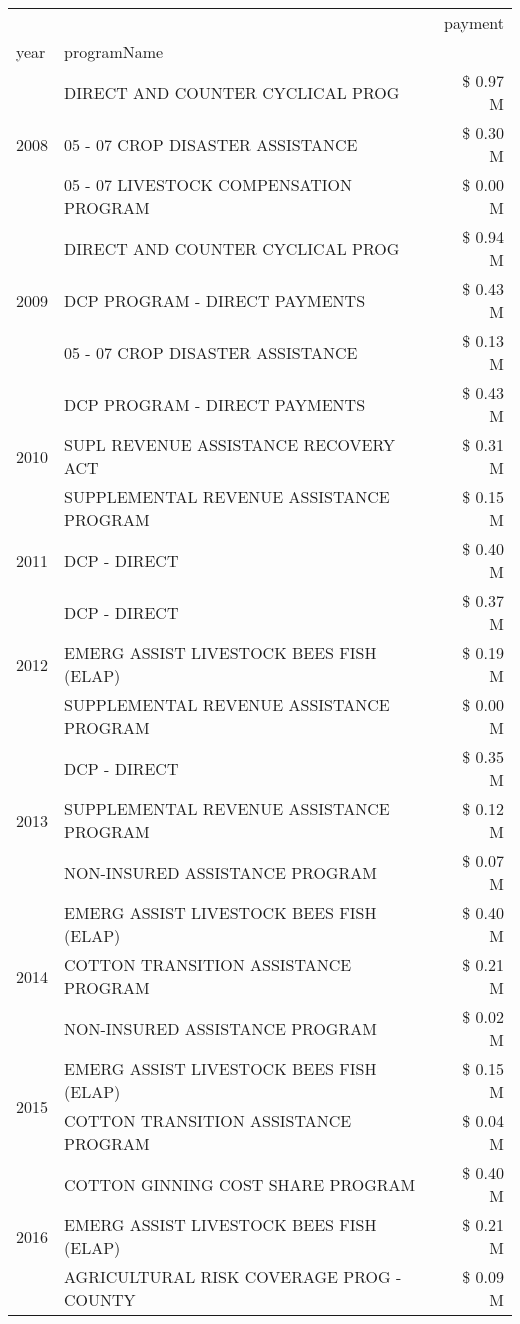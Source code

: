 \begin{tabular}{llr}
\toprule
 &  & payment \\
year & programName &  \\
\midrule
\multirow[t]{3}{*}{2008} & DIRECT AND COUNTER CYCLICAL PROG & \$ 0.97 M \\
 & 05 - 07 CROP DISASTER ASSISTANCE & \$ 0.30 M \\
 & 05 - 07 LIVESTOCK COMPENSATION PROGRAM & \$ 0.00 M \\
\cline{1-3}
\multirow[t]{3}{*}{2009} & DIRECT AND COUNTER CYCLICAL PROG & \$ 0.94 M \\
 & DCP PROGRAM - DIRECT PAYMENTS & \$ 0.43 M \\
 & 05 - 07 CROP DISASTER ASSISTANCE & \$ 0.13 M \\
\cline{1-3}
\multirow[t]{3}{*}{2010} & DCP PROGRAM - DIRECT PAYMENTS & \$ 0.43 M \\
 & SUPL REVENUE ASSISTANCE RECOVERY ACT & \$ 0.31 M \\
 & SUPPLEMENTAL REVENUE ASSISTANCE PROGRAM & \$ 0.15 M \\
\cline{1-3}
2011 & DCP - DIRECT & \$ 0.40 M \\
\cline{1-3}
\multirow[t]{3}{*}{2012} & DCP - DIRECT & \$ 0.37 M \\
 & EMERG ASSIST LIVESTOCK BEES FISH (ELAP) & \$ 0.19 M \\
 & SUPPLEMENTAL REVENUE ASSISTANCE PROGRAM & \$ 0.00 M \\
\cline{1-3}
\multirow[t]{3}{*}{2013} & DCP - DIRECT & \$ 0.35 M \\
 & SUPPLEMENTAL REVENUE ASSISTANCE PROGRAM & \$ 0.12 M \\
 & NON-INSURED ASSISTANCE PROGRAM & \$ 0.07 M \\
\cline{1-3}
\multirow[t]{3}{*}{2014} & EMERG ASSIST LIVESTOCK BEES FISH (ELAP) & \$ 0.40 M \\
 & COTTON TRANSITION ASSISTANCE PROGRAM & \$ 0.21 M \\
 & NON-INSURED ASSISTANCE PROGRAM & \$ 0.02 M \\
\cline{1-3}
\multirow[t]{2}{*}{2015} & EMERG ASSIST LIVESTOCK BEES FISH (ELAP) & \$ 0.15 M \\
 & COTTON TRANSITION ASSISTANCE PROGRAM & \$ 0.04 M \\
\cline{1-3}
\multirow[t]{3}{*}{2016} & COTTON GINNING COST SHARE PROGRAM & \$ 0.40 M \\
 & EMERG ASSIST LIVESTOCK BEES FISH (ELAP) & \$ 0.21 M \\
 & AGRICULTURAL RISK COVERAGE PROG - COUNTY & \$ 0.09 M \\

\end{tabular}
